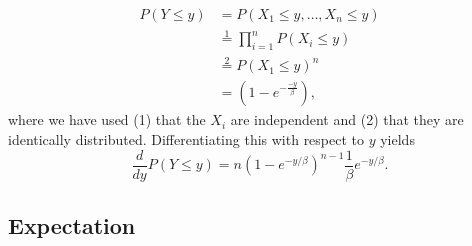 \documentclass{article}
\begin{document}
\begin{enumerate}
\begin{itemize}
$$\begin{aligned}
			P(Y \leq y) &= P(X_1 \leq y, \dots, X_n \leq y) \\
			&\overset{1}{=} \prod_{i = 1}^n P(X_i \leq y) \\
			&\overset{2}{=} P(X_1 \leq y)^n \\
			&= \left(1 - e^{- \frac{- y}{\beta}}\right),
			\end{aligned}
			$$
			where we have used (1) that the $X_i$ are independent and (2) that they are identically distributed. Differentiating this with respect to $y$ yields
			$$
			\frac{d}{dy} P(Y \leq y) = n (1 - e^{- y / \beta})^{n - 1} \frac{1}{\beta} e^{- y / \beta}.
			$$
		\end{itemize}
\end{enumerate}

\subsection{Expectation}
\end{document}
